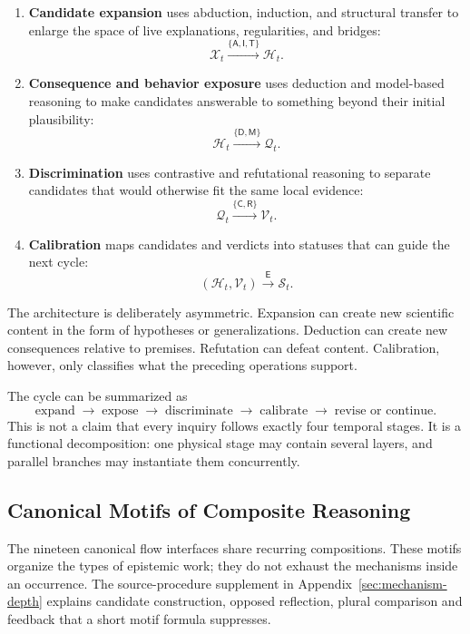 \begin{enumerate}[leftmargin=*,itemsep=0.35em]
\item \textbf{Candidate expansion} uses abduction, induction, and structural
  transfer to enlarge the space of live explanations, regularities, and
  bridges:
  \[
    \mathcal{X}_{t}\xrightarrow{\{\mathsf{A},\mathsf{I},\mathsf{T}\}}
    \mathcal{H}_{t}.
  \]
\item \textbf{Consequence and behavior exposure} uses deduction and
  model-based reasoning to make candidates answerable to something beyond
  their initial plausibility:
  \[
    \mathcal{H}_{t}\xrightarrow{\{\mathsf{D},\mathsf{M}\}}
    \mathcal{Q}_{t}.
  \]
\item \textbf{Discrimination} uses contrastive and refutational reasoning to
  separate candidates that would otherwise fit the same local evidence:
  \[
    \mathcal{Q}_{t}\xrightarrow{\{\mathsf{C},\mathsf{R}\}}
    \mathcal{V}_{t}.
  \]
\item \textbf{Calibration} maps candidates and verdicts into statuses that can
  guide the next cycle:
  \[
    (\mathcal{H}_{t},\mathcal{V}_{t})
    \xrightarrow{\mathsf{E}}\mathcal{S}_{t}.
  \]
\end{enumerate}

The architecture is deliberately asymmetric. Expansion can create new
scientific content in the form of hypotheses or generalizations. Deduction can
create new consequences relative to premises. Refutation can defeat content.
Calibration, however, only classifies what the preceding operations support.

The cycle can be summarized as
\[
  \text{expand}\;\longrightarrow\;\text{expose}\;\longrightarrow\;
  \text{discriminate}\;\longrightarrow\;\text{calibrate}\;
  \longrightarrow\;\text{revise or continue}.
\]
This is not a claim that every inquiry follows exactly four temporal stages.
It is a functional decomposition: one physical stage may contain several
layers, and parallel branches may instantiate them concurrently.

\subsection{Canonical Motifs of Composite Reasoning}

The nineteen canonical flow interfaces share recurring compositions. These
motifs organize the types of epistemic work; they do not exhaust the mechanisms
inside an occurrence. The source-procedure supplement in Appendix~\ref{sec:mechanism-depth} explains candidate
construction, opposed reflection, plural comparison and feedback that a short
motif formula suppresses.

